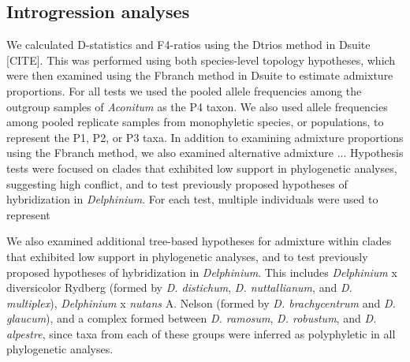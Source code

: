\documentclass[11pt]{article}
\begin{document}

\subsection{Introgression analyses}
We calculated D-statistics \citep{durand_2011} and F4-ratios using the
Dtrios method in Dsuite [CITE].
This was performed using both species-level topology hypotheses, which were then
examined using the Fbranch method in Dsuite to estimate admixture proportions.
% 
For all tests we used the pooled allele frequencies among the outgroup samples of \emph{Aconitum} as the P4 taxon. We also used allele frequencies among pooled
replicate samples from monophyletic species, or populations, to represent the
P1, P2, or P3 taxa. 
% 
In addition to examining admixture proportions using the Fbranch method, we also
examined alternative admixture ...
Hypothesis tests were focused on clades that exhibited low 
support in phylogenetic analyses, suggesting high conflict, and to test previously 
proposed hypotheses of hybridization in \emph{Delphinium}. 
For each test, multiple individuals were used to represent 


% 
We also examined additional tree-based hypotheses for admixture within 
clades that exhibited low support in phylogenetic analyses, and to
test previously proposed hypotheses of hybridization in \emph{Delphinium}. 
% 
This includes \emph{Delphinium} x diversicolor Rydberg 
(formed by \emph{D. distichum}, \emph{D. nuttallianum}, and \emph{D. multiplex}), 
% 
\emph{Delphinium} x \emph{nutans} A. Nelson (formed by \emph{D. brachycentrum} and \emph{D. glaucum}),
% 
and a complex formed between \emph{D. ramosum}, \emph{D. robustum}, and \emph{D. alpestre},
since taxa from each of these groups were inferred as polyphyletic in 
all phylogenetic analyses.
\end{document}
